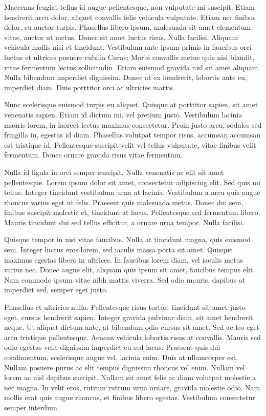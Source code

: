 \documentclass{llncs}
\begin{document}
Maecenas feugiat tellus id augue pellentesque, non vulputate mi suscipit. Etiam hendrerit arcu dolor, aliquet convallis felis vehicula vulputate. Etiam nec finibus dolor, eu auctor turpis. Phasellus libero ipsum, malesuada sit amet elementum vitae, auctor ut metus. Donec sit amet luctus risus. Nulla facilisi. Aliquam vehicula mollis nisi et tincidunt. Vestibulum ante ipsum primis in faucibus orci luctus et ultrices posuere cubilia Curae; Morbi convallis metus quis nisl blandit, vitae fermentum lectus sollicitudin. Etiam euismod gravida nisl sit amet aliquam. Nulla bibendum imperdiet dignissim. Donec at ex hendrerit, lobortis ante eu, imperdiet diam. Duis porttitor orci ac ultricies mattis.

Nunc scelerisque euismod turpis eu aliquet. Quisque at porttitor sapien, sit amet venenatis sapien. Etiam id dictum mi, vel pretium justo. Vestibulum lacinia mauris lorem, in laoreet lectus maximus consectetur. Proin justo arcu, sodales sed fringilla in, egestas id diam. Phasellus volutpat tempor risus, accumsan accumsan est tristique id. Pellentesque suscipit velit vel tellus vulputate, vitae finibus velit fermentum. Donec ornare gravida risus vitae fermentum.

Nulla id ligula in orci semper suscipit. Nulla venenatis ac elit sit amet pellentesque. Lorem ipsum dolor sit amet, consectetur adipiscing elit. Sed quis mi tellus. Integer tincidunt vestibulum urna at lacinia. Vestibulum a arcu quis augue rhoncus varius eget ut felis. Praesent quis malesuada metus. Donec dui sem, finibus suscipit molestie et, tincidunt at lacus. Pellentesque sed fermentum libero. Mauris tincidunt dui sed tellus efficitur, a ornare urna tempor. Nulla facilisi.

Quisque tempor in nisi vitae faucibus. Nulla at tincidunt magna, quis euismod sem. Integer luctus eros lorem, sed iaculis massa porta sit amet. Quisque maximus egestas libero in ultrices. In faucibus lorem diam, vel iaculis metus varius nec. Donec augue elit, aliquam quis ipsum sit amet, faucibus tempus elit. Nam commodo ipsum vitae nibh mattis viverra. Sed odio mauris, dapibus at imperdiet sed, semper eget justo.

Phasellus et ultricies nulla. Pellentesque risus tortor, tincidunt sit amet justo eget, cursus hendrerit sapien. Integer gravida pulvinar diam, sit amet hendrerit neque. Ut aliquet dictum ante, at bibendum odio cursus sit amet. Sed ac leo eget arcu tristique pellentesque. Aenean vehicula lobortis risus at convallis. Mauris sed odio egestas velit dignissim imperdiet eu sed lacus. Praesent quis dui condimentum, scelerisque augue vel, lacinia enim. Duis at ullamcorper est. Nullam posuere purus ac elit tempus dignissim rhoncus vel enim. Nullam vel lorem ac nisl dapibus suscipit. Nullam sit amet felis ac diam volutpat molestie a nec magna. In velit eros, rutrum rutrum urna ornare, gravida molestie odio. Nam mollis erat quis augue rhoncus, et finibus libero egestas. Vestibulum consectetur semper interdum.
\end{document}
